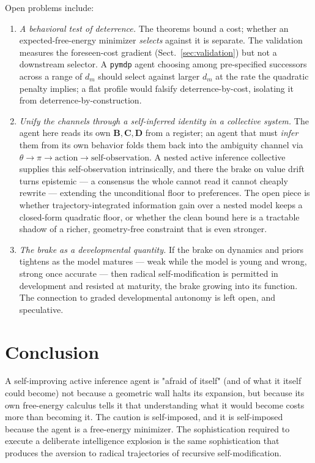 \documentclass[runningheads]{llncs}
\begin{document}
Open problems include:
\begin{enumerate}
\item \emph{A behavioral test of deterrence.}
The theorems bound a cost; whether an expected-free-energy minimizer \emph{selects} against it is separate. The validation measures the foreseen-cost gradient (Sect.~\ref{sec:validation}) but not a downstream selector. A \texttt{pymdp} agent choosing among pre-specified successors across a range of $d_m$ should select against larger $d_m$ at the rate the quadratic penalty implies; a flat profile would falsify deterrence-by-cost, isolating it from deterrence-by-construction.

\item \emph{Unify the channels through a self-inferred identity in a collective system.}
The agent here reads its own $\mathbf{B}, \mathbf{C}, \mathbf{D}$ from a register; an agent that must \emph{infer} them from its own behavior folds them back into the ambiguity channel via $\theta \to \pi \to \text{action} \to \text{self-observation}$. A nested active inference collective supplies this self-observation intrinsically, and there the brake on value drift turns epistemic --- a consensus the whole cannot read it cannot cheaply rewrite --- extending the unconditional floor to preferences. The open piece is whether trajectory-integrated information gain over a nested model keeps a closed-form quadratic floor, or whether the clean bound here is a tractable shadow of a richer, geometry-free constraint that is even stronger.

\item \emph{The brake as a developmental quantity.} If the brake on dynamics and
priors tightens as the model matures --- weak while the model is young and
wrong, strong once accurate --- then radical self-modification is permitted in
development and resisted at maturity, the brake growing into its function. The
connection to graded developmental autonomy is left open, and speculative.

\end{enumerate}


\section{Conclusion}

A self-improving active inference agent is "afraid of itself" (and of what it itself could become) not because a geometric wall halts its expansion, but because its own free-energy calculus tells it that understanding what it would become costs more than becoming it. The caution is self-imposed, and it is self-imposed because the agent is a free-energy minimizer. The sophistication required to execute a deliberate intelligence explosion is the same sophistication that produces the aversion to radical trajectories of recursive self-modification.
\end{document}
